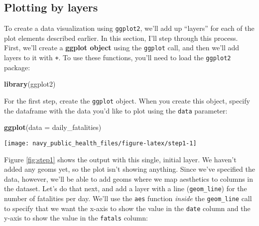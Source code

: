 \documentclass[]{tufte-book}
\newenvironment{Shaded}{}{}
\newcommand{\DataTypeTok}[1]{\textcolor[rgb]{0.56,0.13,0.00}{#1}}
\newcommand{\KeywordTok}[1]{\textcolor[rgb]{0.00,0.44,0.13}{\textbf{#1}}}
\newcommand{\NormalTok}[1]{#1}
\begin{document}
\hypertarget{plotting-by-layers}{%
\subsection{Plotting by layers}\label{plotting-by-layers}}

To create a data visualization using \texttt{ggplot2}, we'll add up ``layers'' for each of
the plot elements described earlier. In this section, I'll step through this process.
First, we'll create a \textbf{ggplot object} using the \texttt{ggplot} call, and then we'll add
layers to it with \texttt{+}. To use these functions, you'll need to load the \texttt{ggplot2}
package:

\begin{Shaded}
\begin{Highlighting}[]
\KeywordTok{library}\NormalTok{(ggplot2)}
\end{Highlighting}
\end{Shaded}

For the first step, create the \texttt{ggplot} object. When you create this object, specify
the dataframe with the data you'd like to plot using the \texttt{data} parameter:

\begin{Shaded}
\begin{Highlighting}[]
\KeywordTok{ggplot}\NormalTok{(}\DataTypeTok{data =}\NormalTok{ daily_fatalities)}
\end{Highlighting}
\end{Shaded}

\begin{figure*}
\texttt{[image: navy\_public\_health\_files/figure-latex/step1-1]} \caption[Step 1 of layering a plot]{Step 1 of layering a plot: Creating the ggplot object. At this point, nothing's actually plotted, because we haven't added any geoms yet.}\label{fig:step1}
\end{figure*}

Figure \ref{fig:step1} shows the output with this single, initial layer. We haven't added any geoms yet, so the plot isn't showing anything. Since we've specified the
data, however, we'll be able to add geoms where we map aesthetics to columns in the
dataset. Let's do that next, and add a layer with a line (\texttt{geom\_line}) for the number
of fatalities per day. We'll use the \texttt{aes} function \emph{inside} the \texttt{geom\_line} call
to specify that we want the x-axis to show the value in the \texttt{date} column and the
y-axis to show the value in the \texttt{fatals} column:
\end{document}
